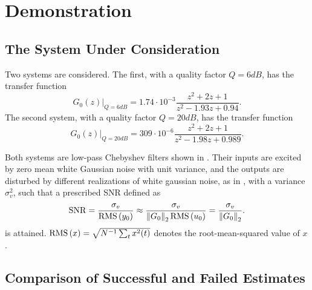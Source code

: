 
\section{Demonstration}\label{se:Demo}

\subsection{The System Under Consideration}

Two systems are considered. The first, with a quality factor $Q = 6\unit{dB}$, has the transfer function
  \begin{equation}
     G_0(z) \Big|_{Q=6\unit{dB}}
    = 1.74 \cdot 10^{-3}
    \frac{ z^2 + 2 z + 1 }
         { z^2 - 1.93 z + 0.94}
    \label{eq:systemundertest}
    \text{.}
  \end{equation}
The second system, with a quality factor $Q = 20\unit{dB}$, has the transfer function
  \begin{equation}
    G_0(z) \Big|_{Q=20\unit{dB}}
    = 309 \cdot 10^{-6}
            \frac{z^2 + 2 z + 1}
                 {z^2 - 1.98 z + 0.989}
    \label{eq:systundertest-20dB}
    \text{.}
  \end{equation}

Both systems are low-pass Chebyshev filters shown in . 
Their inputs are excited by zero mean white Gaussian noise with unit variance, and the outputs are disturbed by different realizations of white gaussian noise, as in , with a variance $\sigma_v^2$, such that a prescribed \gls{SNR} defined as
\begin{equation}
  \mathrm{SNR} 
    = \frac{\sigma_v}
           {\operatorname{RMS} \left( y_0 \right)}
    \approx \frac{\sigma_{v}}
                 {\left\| G_0 \right\|_2 \operatorname{RMS} \left( u_0 \right)}
    =  \frac{\sigma_{v}}
            {\left\| G_0 \right\|_2}
  \label{eq:SNR-definition}
  \text{.}
\end{equation}
is attained.
$\operatorname{RMS} \left( x \right) = \sqrt{N^{-1} \sum_t x^2(t)}$ denotes the root-mean-squared value of $x$.


\subsection{Comparison of Successful and Failed Estimates}


